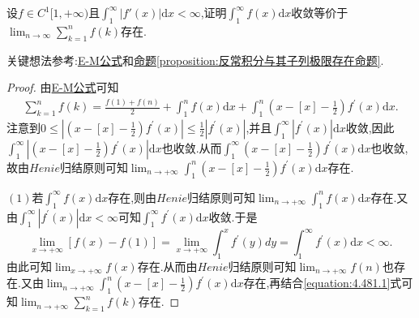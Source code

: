 \documentclass[../../main.tex]{subfiles}
\begin{document}
\begin{example}
设\(f\in C^1[1,+\infty)\)且\(\int_{1}^{\infty}|f'(x)|\mathrm{d}x<\infty\),证明\(\int_{1}^{\infty}f(x)\mathrm{d}x\)收敛等价于\(\lim_{n\rightarrow\infty}\sum_{k = 1}^{n}f(k)\)存在.
\end{example}
\begin{note}
关键想法参考:\hyperref[proposition:0阶欧拉麦克劳林公式(0阶E-M公式)]{E-M公式}和\hyperref[proposition:反常积分与其子列极限存在命题]{命题\ref{proposition:反常积分与其子列极限存在命题}}.
\end{note}
\begin{proof}
由\hyperref[proposition:0阶欧拉麦克劳林公式(0阶E-M公式)]{E-M公式}可知
\begin{align}\label{equation:4.481.1}
\sum_{k = 1}^n f(k)=\frac{f(1) + f(n)}{2}+\int_1^n f(x)\mathrm{d}x+\int_1^n\left(x - [x] - \frac{1}{2}\right)f^\prime(x)\mathrm{d}x.
\end{align}
注意到\(0\leqslant\left|\left(x - [x] - \frac{1}{2}\right)f^\prime(x)\right|\leqslant\frac{1}{2}\left|f^\prime(x)\right|\),并且\(\int_1^{\infty}\left|f^\prime(x)\right|\mathrm{d}x\)收敛,因此\(\int_1^{\infty}\left|\left(x - [x] - \frac{1}{2}\right)f^\prime(x)\right|\mathrm{d}x\)也收敛.从而\(\int_1^{\infty}\left(x - [x] - \frac{1}{2}\right)f^\prime(x)\mathrm{d}x\)也收敛,故由\(Henie\)归结原则可知\(\lim_{n\rightarrow +\infty}\int_1^n\left(x - [x] - \frac{1}{2}\right)f^\prime(x)\mathrm{d}x\)存在.

\((1)\)若\(\int_1^{\infty}f(x)\mathrm{d}x\)存在,则由\(Henie\)归结原则可知\(\lim_{n\rightarrow +\infty}\int_1^n f(x)\mathrm{d}x\)存在.又由\(\int_1^{\infty}\left|f^\prime(x)\right|\mathrm{d}x < \infty\)可知\(\int_1^{\infty}f^\prime(x)\mathrm{d}x\)收敛.于是
\[
\lim_{x\rightarrow +\infty}[f(x) - f(1)]=\lim_{x\rightarrow +\infty}\int_1^x f^\prime(y)dy=\int_1^{\infty}f^\prime(x)\mathrm{d}x < \infty.
\]
由此可知\(\lim_{x\rightarrow +\infty}f(x)\)存在.从而由\(Henie\)归结原则可知\(\lim_{n\rightarrow +\infty}f(n)\)也存在.又由\(\lim_{n\rightarrow +\infty}\int_1^n\left(x - [x] - \frac{1}{2}\right)f^\prime(x)\mathrm{d}x\)存在,再结合\eqref{equation:4.481.1}式可知\(\lim_{n\rightarrow +\infty}\sum_{k = 1}^n f(k)\)存在.


\end{proof}
\end{document}
